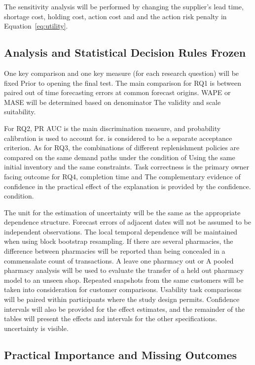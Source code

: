 \documentclass[a4paper,11pt,oneside]{book}
\theoremstyle{plain}
\theoremstyle{definition}
\theoremstyle{remark}
\begin{document}
The sensitivity analysis will be performed by changing the supplier's lead time, shortage cost, holding cost, action cost and and the action risk penalty in Equation~\ref{eq:utility}.

\subsection{Analysis and Statistical Decision Rules Frozen}
\label{subsec:frozen_analysis_rules}

One key comparison and one key measure (for each research question) will be fixed Prior to opening the final test. The main comparison for RQ1 is between paired out of time forecasting errors at common forecast origins. WAPE or MASE will be determined based on denominator The validity and scale suitability.

For RQ2, PR AUC is the main discrimination measure, and probability calibration is used to account for. is considered to be a separate acceptance criterion. As for RQ3, the combinations of different replenishment policies are compared on the same demand paths under the condition of Using the same initial inventory and the same constraints. Task correctness is the primary owner facing outcome for RQ4, completion time and The complementary evidence of confidence in the practical effect of the explanation is provided by the confidence. condition.

The unit for the estimation of uncertainty will be the same as the appropriate dependence structure. Forecast errors of adjacent dates will not be assumed to be independent observations. The local temporal dependence will be maintained when using block bootstrap resampling. If there are several pharmacies, the difference between pharmacies will be reported than being concealed in a commensalate count of transactions. A leave one pharmacy out or A pooled pharmacy analysis will be used to evaluate the transfer of a held out pharmacy model to an unseen shop. Repeated snapshots from the same customers will be taken into consideration for customer comparisons. Usability task comparisons will be paired within participants where the study design permits. Confidence intervals will also be provided for the effect estimates, and the remainder of the tables will present the effects and intervals for the other specifications. uncertainty is visible.

\subsection{Practical Importance and Missing Outcomes}
\label{subsec:practical_importance}
\end{document}
